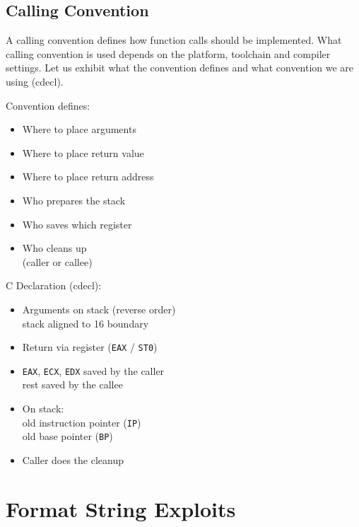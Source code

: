 \documentclass[article]{uibk}
\begin{document}
\subsection{Calling Convention}
\label{sub:calling_convention}

A calling convention defines how function calls should be implemented. What
calling convention is used depends on the platform, toolchain and compiler
settings. Let us exhibit what the convention defines and what convention we are
using (cdecl).

\begin{minipage}[t]{0.48\textwidth}
    Convention defines:
    \begin{itemize}
        \item Where to place arguments
        \item Where to place return value
        \item Where to place return address
        \item Who prepares the stack
        \item Who saves which register
        \item Who cleans up\\
            (caller or callee)
    \end{itemize}
\end{minipage}\hfill
\begin{minipage}[t]{0.48\textwidth}
    C Declaration (cdecl):
    \begin{itemize}
        \item Arguments on stack (reverse order)\\
            stack aligned to \SI{16}{\byte} boundary
        \item Return via register (\texttt{EAX} / \texttt{ST0})
        \item \texttt{EAX}, \texttt{ECX}, \texttt{EDX} saved by the caller\\
            rest saved by the callee
        \item On stack:\\
            old instruction pointer (\texttt{IP})\\
            old base pointer (\texttt{BP})
        \item Caller does the cleanup
    \end{itemize}
\end{minipage}

\section{Format String Exploits}
\end{document}
